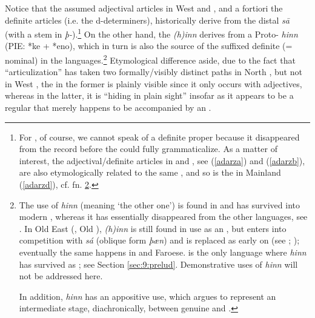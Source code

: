 \documentclass[output=paper,colorlinks,citecolor=brown]{langscibook}
\begin{document}
Notice that the assumed adjectival articles in West  and , and a fortiori the definite articles (i.e. the d-determiners), historically derive from the distal  \textit{s\={a}} (with a stem in \textit{þ-}).\footnote{For , of course, we cannot speak of a definite  proper because it disappeared from the record before the  could fully grammaticalize. As a matter of interest, the adjectival/definite articles in  and , see (\ref{adarza}) and (\ref{adarzb}), are also etymologically related to the same , and so is the  in Mainland  (\ref{adarzd}), cf.  fn. \ref{demS}.} On the other hand, the   \textit{(h)inn}  derives from a Proto-  \textit{hinn} (PIE: *ke + *eno), which in turn is also the source of the suffixed definite (= nominal)  in the  languages.\footnote{\label{demS}The  use of \textit{hinn} (meaning `the other one') is found in  and has survived into modern , whereas it has essentially disappeared from the other  languages, see \citet{Pfaff2019}.  
In Old East  (, Old ), \textit{(h)inn} is still found in use as an , but enters into competition with \textit{sá} (oblique form \textit{þ{æn}}) and is replaced as  early on (see \citealp{Ulla2009,Ulla2015,Ulla2020}; \citealp{Pfaff2019}); eventually the same happens in  and Faroese.  is the only language where \textit{hinn} has survived as ; see Section  \ref{sec:9:prelud}. Demonstrative uses of \textit{hinn} will not be addressed here.

In addition, \textit{{h}inn} has an appositive use, which  \citet{Pfaff2020,Pfaff2023} argues  to represent an intermediate stage, diachronically, between genuine  and . } 
Etymological difference aside, due to the fact that ``articulization'' has taken two formally/visibly distinct paths in North , but not in West , the  in the former is plainly visible since it only occurs with adjectives, whereas in the latter, it is ``hiding in plain sight'' insofar as it appears to be a regular  that merely happens to be accompanied by an . 
\end{document}
